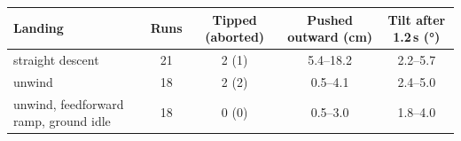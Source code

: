 \begin{tabularx}{\textwidth}{>{\raggedright\arraybackslash}Xcccc}
\toprule
Landing & Runs & Tipped (aborted) & Pushed outward (cm) & Tilt after 1.2\,s (\si{\degree}) \\
\midrule
straight descent & 21 & 2 (1) & 5.4--18.2 & 2.2--5.7 \\
unwind & 18 & 2 (2) & 0.5--4.1 & 2.4--5.0 \\
unwind, feedforward ramp, ground idle & 18 & 0 (0) & 0.5--3.0 & 1.8--4.0 \\
\bottomrule
\end{tabularx}
